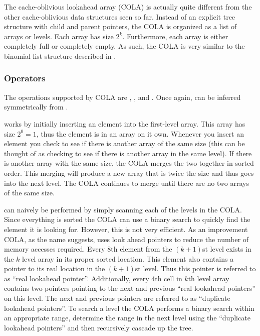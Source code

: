 \documentclass{style}
\begin{document}
The cache-oblivious lookahead array (COLA) is actually quite different from
the other cache-oblivious data structures seen so far. Instead of an explicit
tree structure with child and parent pointers, the COLA is organized as a list
of arrays or levels. Each array has size $2^k$. Furthermore, each array is
either completely full or completely empty. As such, the COLA is very similar
to the binomial list structure described in \cite{BentleySaxe}.

\subsubsection{Operators}

The operations supported by COLA are \Search{}, \Insert{}, and \Scan{}. Once
again, \Delete{} can be inferred symmetrically from \Insert{}.

\Insert{} works by initially inserting an element into the first-level array.
This array has size $2^0 = 1$, thus the element is in an array on it own.
Whenever you insert an element you check to see if there is another array of
the same size (this can be thought of as checking to see if there is another
array in the same level). If there is another array with the same size, the
COLA merges the two together in sorted order. This merging will produce a new
array that is twice the size and thus goes into the next level. The COLA
continues to merge until there are no two arrays of the same size.

\Search{} can naively be performed by simply scanning each of the levels in
the COLA. Since everything is sorted the COLA can use a binary search to
quickly find the element it is looking for. However, this is not very
efficient. As an improvement COLA, as the name suggests, uses look ahead
pointers to reduce the number of memory accesses required. Every 8th element
from the $(k+1)$st level exists in the $k$ level array in its proper sorted
location. This element also contains a pointer to its real location in the
$(k+1)$st level. Thus this pointer is referred to as ``real lookahead
pointer''. Additionally, every 4th cell in $k$th level array contains two
pointers pointing to the next and previous ``real lookahead pointers'' on this
level. The next and previous pointers are referred to as ``duplicate lookahead
pointers''. To search a level the COLA performs a binary search within an
appropriate range, determine the range in the next level using the ``duplicate
lookahead pointers'' and then recursively cascade up the tree.
\end{document}
